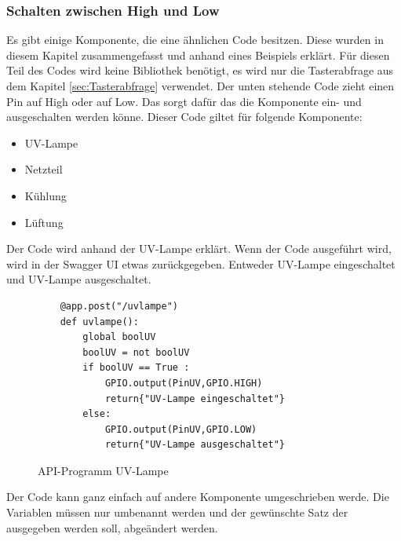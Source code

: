 \subsubsection{Schalten zwischen High und Low}\label{sec:Einschalten}
Es gibt einige Komponente, die eine ähnlichen Code besitzen. Diese wurden in diesem Kapitel zusammengefasst und anhand eines Beispiels erklärt. Für diesen Teil des Codes wird keine Bibliothek benötigt, es wird nur die Tasterabfrage aus dem Kapitel \ref{sec:Tasterabfrage} verwendet. Der unten stehende Code zieht einen Pin auf High oder auf Low. Das sorgt dafür das die Komponente ein- und ausgeschalten werden könne. Dieser Code giltet für folgende Komponente:
\begin{itemize}
    \item UV-Lampe
    \item Netzteil
    \item Kühlung
    \item Lüftung
\end{itemize}
Der Code wird anhand der UV-Lampe erklärt. Wenn der Code ausgeführt wird, wird in der Swagger UI etwas zurückgegeben. Entweder UV-Lampe eingeschaltet und UV-Lampe ausgeschaltet.\\
\vspace{3mm}
\begin{figure}[H]
    \centering
    \begin{verbatim}
    @app.post("/uvlampe")
    def uvlampe():
        global boolUV
        boolUV = not boolUV
        if boolUV == True :
            GPIO.output(PinUV,GPIO.HIGH)
            return{"UV-Lampe eingeschaltet"}
        else:
            GPIO.output(PinUV,GPIO.LOW)
            return{"UV-Lampe ausgeschaltet"}
    \end{verbatim}
    \caption{API-Programm UV-Lampe}
\end{figure}
Der Code kann ganz einfach auf andere Komponente umgeschrieben werde. Die Variablen müssen nur umbenannt werden und der gewünschte Satz der ausgegeben werden soll, abgeändert werden.
\vspace{3mm}

